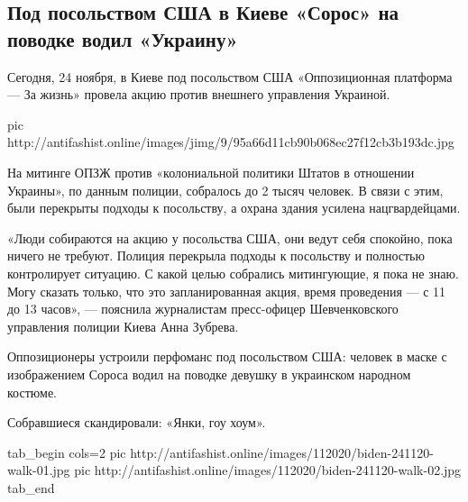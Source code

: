  
 
 
 
 
 
\subsection{Под посольством США в Киеве «Сорос» на поводке водил «Украину»}
\label{sec:24_11_2020.news.antifashist_online.1.soros_ukraine}

Сегодня, 24 ноября, в Киеве под посольством США «Оппозиционная платформа --- За
жизнь» провела акцию против внешнего управления Украиной.

\ifcmt
pic http://antifashist.online/images/jimg/9/95a66d11cb90b068ec27f12cb3b193dc.jpg
\fi

На митинге ОПЗЖ против «колониальной политики Штатов в отношении Украины», по
данным полиции, собралось до 2 тысяч человек. В связи с этим, были перекрыты
подходы к посольству, а охрана здания усилена нацгвардейцами.

«Люди собираются на акцию у посольства США, они ведут себя спокойно, пока
ничего не требуют. Полиция перекрыла подходы к посольству и полностью
контролирует ситуацию. С какой целью собрались митингующие, я пока не знаю.
Могу сказать только, что это запланированная акция, время проведения --- с 11 до
13 часов», --- пояснила журналистам пресс-офицер Шевченковского управления
полиции Киева Анна Зубрева.

Оппозиционеры устроили перфоманс под посольством США: человек в маске с
изображением Сороса водил на поводке девушку в украинском народном костюме.

Собравшиеся скандировали: «Янки, гоу хоум».

\ifcmt
tab_begin cols=2
pic http://antifashist.online/images/112020/biden-241120-walk-01.jpg
pic http://antifashist.online/images/112020/biden-241120-walk-02.jpg
tab_end
\fi


